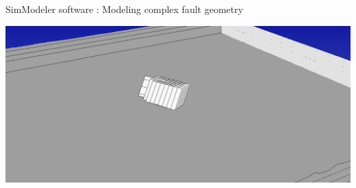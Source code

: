 \documentclass{beamer}
\begin{document}
\begin{frame}
 {SimModeler software : Modeling complex fault geometry}
 
 \includegraphics[width=1\linewidth]{images/simmodeler11}
 
\end{frame}
\end{document}
